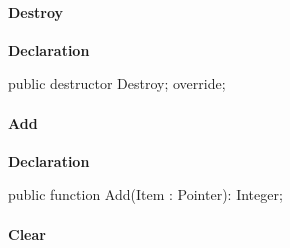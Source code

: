 \documentclass{report}
\newif\ifpdf
\begin{document}
\paragraph*{Destroy}\hspace*{\fill}

\label{AbArcTyp.TAbArchiveList-Destroy}
\begin{list}{}{
\setlength{\itemindent}{0cm}
\setlength{\listparindent}{0cm}
\setlength{\leftmargin}{\evensidemargin}
\addtolength{\leftmargin}{\tmplength}
\settowidth{\labelsep}{X}
\addtolength{\leftmargin}{\labelsep}
\setlength{\labelwidth}{\tmplength}
}
\item[\textbf{Declaration}\hfill]
\ifpdf
\begin{flushleft}
\fi
\begin{ttfamily}
public destructor Destroy; override;\end{ttfamily}

\ifpdf
\end{flushleft}
\fi

\end{list}
\paragraph*{Add}\hspace*{\fill}

\label{AbArcTyp.TAbArchiveList-Add}
\begin{list}{}{
\setlength{\itemindent}{0cm}
\setlength{\listparindent}{0cm}
\setlength{\leftmargin}{\evensidemargin}
\addtolength{\leftmargin}{\tmplength}
\settowidth{\labelsep}{X}
\addtolength{\leftmargin}{\labelsep}
\setlength{\labelwidth}{\tmplength}
}
\item[\textbf{Declaration}\hfill]
\ifpdf
\begin{flushleft}
\fi
\begin{ttfamily}
public function Add(Item : Pointer): Integer;\end{ttfamily}

\ifpdf
\end{flushleft}
\fi

\end{list}
\paragraph*{Clear}\hspace*{\fill}
\end{document}
